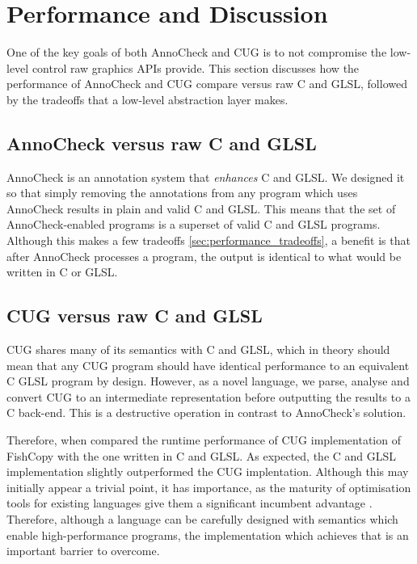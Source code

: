 \documentclass[a4paper,12pt,twoside,openright]{report}
\begin{document}
\section{Performance and Discussion}

One of the key goals of both AnnoCheck and CUG is to not compromise the
low-level control raw graphics APIs provide. This section discusses how the
performance of AnnoCheck and CUG compare versus raw C and GLSL, followed by the
tradeoffs that a low-level abstraction layer makes.

\subsection{AnnoCheck versus raw C and GLSL}

AnnoCheck is an annotation system that \textit{enhances} C and GLSL. We
designed it so that simply removing the annotations from any program which uses
AnnoCheck results in plain and valid C and GLSL. This means that the set of
AnnoCheck-enabled programs is a superset of valid C and GLSL programs. Although
this makes a few tradeoffs \ref{sec:performance_tradeoffs}, a benefit is that
after AnnoCheck processes a program, the output is identical to what would be
written in C or GLSL.


\subsection{CUG versus raw C and GLSL}

CUG shares many of its semantics with C and GLSL, which in theory should mean
that any CUG program should have identical performance to an equivalent C GLSL
program by design. However, as a novel language, we parse, analyse and convert
CUG to an intermediate representation before outputting the results to a C
back-end. This is a destructive operation in contrast to AnnoCheck's solution.

Therefore, when compared the runtime performance of CUG implementation of
FishCopy with the one written in C and GLSL. As expected, the C and GLSL
implementation slightly outperformed the CUG implentation. Although this may
initially appear a trivial point, it has importance, as the maturity of
optimisation tools for existing languages give them a significant incumbent
advantage \cite{RustSlow}. Therefore, although a language can be carefully
designed with semantics which enable high-performance programs, the
implementation which achieves that is an important barrier to overcome.
\end{document}
